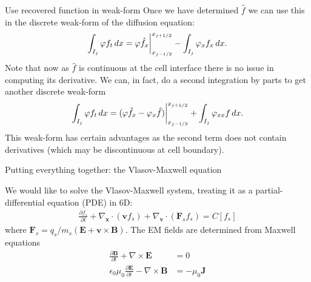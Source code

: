 \documentclass[aspectratio=169]{beamer}
\newcommand{\pfrac}[2]{\frac{\partial #1}{\partial #2}}
\newcommand{\mvec}[1]{\mathbf{#1}}
\newcommand{\gcs}{\nabla_{\mvec{x}}}
\newcommand{\gvs}{\nabla_{\mvec{v}}}
\begin{document}
\begin{frame}{Use recovered function in weak-form}
  Once we have determined $\hat{f}$ we can use this in the discrete
  weak-form of the diffusion equation:
  \begin{align*}
    \int_{I_j} \varphi f_t \thinspace dx =   \varphi \hat{f}_x \bigg|^{x_{j+1/2}}_{x_{j-1/2}}
    -
    \int_{I_j} \varphi_{x} f_x \thinspace dx.
  \end{align*}
  Note that now as $\hat{f}$ is continuous at the cell interface there
  is no issue in computing its derivative. We can, in fact, do a
  second integration by parts to get another discrete weak-form
  \begin{align*}
    \int_{I_j} \varphi f_t \thinspace dx =   (\varphi \hat{f}_x - \varphi_x \hat{f})\bigg|^{x_{j+1/2}}_{x_{j-1/2}}
    +
    \int_{I_j} \varphi_{xx} f \thinspace dx.
  \end{align*}
  This weak-form has certain advantages as the second term does not
  contain derivatives (which may be discontinuous at cell
  boundary).
\end{frame}

\begin{frame}{Putting everything together: the Vlasov-Maxwell equation}

  We would like to solve the Vlasov-Maxwell system, treating it as a
  partial-differential equation (PDE) in 6D:
  \begin{align*}
    \pfrac{f_s}{t} + \gcs\cdot (\mvec{v} f_s) + \gvs\cdot (\mvec{F}_s
    f_s) = C[f_s]
  \end{align*}
  where $\mvec{F}_s=q_s/m_s (\mvec{E}+\mvec{v}\times\mvec{B})$. The EM
  fields are determined from Maxwell equations
  \begin{align*}
    \frac{\partial \mvec{B}}{\partial t} + \nabla\times\mvec{E} &= 0 \\
    \epsilon_0\mu_0\frac{\partial \mvec{E}}{\partial t} -
    \nabla\times\mvec{B} &= -\mu_0\mvec{J}
  \end{align*}
\end{frame}
\end{document}
